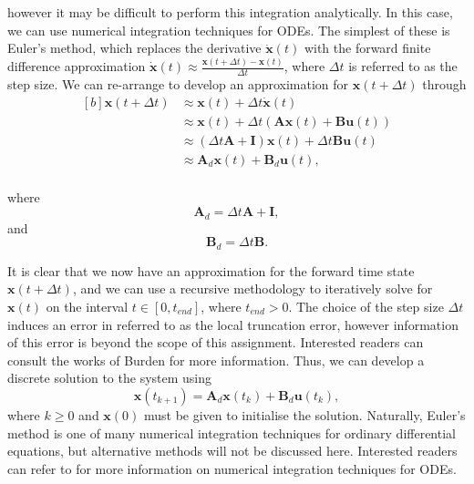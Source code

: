 \documentclass{article}
\begin{document}
however it may be difficult to perform this integration analytically. In this case, we can use numerical integration techniques for ODEs. The simplest of these is Euler's method, which replaces the derivative $\dot{\mathbf{x}}(t)$ with the forward finite difference approximation $\dot{\mathbf{x}}(t) \approx \frac{\mathbf{x}(t + \Delta t) - \mathbf{x}(t)}{\Delta t}$, where $\Delta t$ is referred to as the step size. We can re-arrange to develop an approximation for $\mathbf{x}(t + \Delta t)$ through
\begin{equation}
\begin{aligned}[b]
\mathbf{x}(t + \Delta t) &\approx \mathbf{x}(t) + \Delta t \dot{\mathbf{x}}(t) \\
&\approx \mathbf{x}(t) + \Delta t  \left(  \mathbf{A}\mathbf{x}(t) + \mathbf{B}\mathbf{u}(t) \right) \\
&\approx \left( \Delta t \mathbf{A} + \mathbf{I} \right) \mathbf{x}(t) + \Delta t \mathbf{B}\mathbf{u}(t) \\
&\approx \mathbf{A}_d  \mathbf{x}(t) + \mathbf{B}_d \mathbf{u}(t), \\
\end{aligned}
\end{equation}

where
\begin{equation}
\mathbf{A}_d = \Delta t \mathbf{A} + \mathbf{I},
\end{equation}
and
\begin{equation}
\mathbf{B}_d = \Delta t \mathbf{B}.
\end{equation}

It is clear that we now have an approximation for the forward time state $\mathbf{x}(t + \Delta t)$, and we can use a recursive methodology to iteratively solve for $\mathbf{x}(t)$ on the interval $t \in \left[ 0, t_{end} \right]$, where $t_{end} >0$. The choice of the step size $\Delta t$ induces an error in referred to as the local truncation error, however information of this error is beyond the scope of this assignment. Interested readers can consult the works of Burden \cite{Burden2016} for more information. Thus, we can develop a discrete solution to the system using
\begin{equation}
\mathbf{x}(t_{k + 1}) = \mathbf{A}_d  \mathbf{x}(t_k) + \mathbf{B}_d \mathbf{u}(t_k),
\end{equation}
where $k \geq 0$ and $\mathbf{x}(0)$ must be given to initialise the solution. Naturally, Euler's method is one of many numerical integration techniques for ordinary differential equations, but alternative methods will not be discussed here. Interested readers can refer to \cite{Burden2016} for more information on numerical integration techniques for ODEs.
\end{document}
